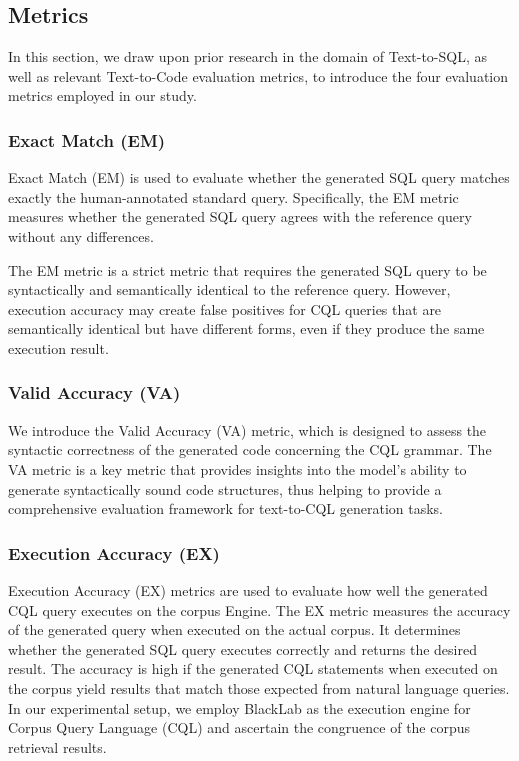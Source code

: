 \documentclass[11pt]{article}
\begin{document}
\begin{CJK*}{UTF8}{gbsn}
\subsection{Metrics}

In this section, we draw upon prior research in the domain of Text-to-SQL, as well as relevant Text-to-Code evaluation metrics, to introduce the four evaluation metrics employed in our study.

\subsubsection{Exact Match (EM)}

Exact Match (EM) is used to evaluate whether the generated SQL query matches exactly the human-annotated standard query. Specifically, the EM metric measures whether the generated SQL query agrees with the reference query without any differences. 

The EM metric is a strict metric that requires the generated SQL query to be syntactically and semantically identical to the reference query. However, execution accuracy may create false positives for CQL queries that are semantically identical but have different forms, even if they produce the same execution result\citep{yu2018spider, deng-etal-2022-recent}.  

\subsubsection{Valid Accuracy (VA)}

We introduce the Valid Accuracy (VA) metric, which is designed to assess the syntactic correctness of the generated code concerning the CQL grammar. The VA metric is a key metric that provides insights into the model's ability to generate syntactically sound code structures, thus helping to provide a comprehensive evaluation framework for text-to-CQL generation tasks.

\subsubsection{Execution Accuracy (EX)}
Execution Accuracy (EX) metrics are used to evaluate how well the generated CQL query executes on the corpus Engine. The EX metric measures the accuracy of the generated query when executed on the actual corpus. It determines whether the generated SQL query executes correctly and returns the desired result. The accuracy is high if the generated CQL statements when executed on the corpus yield results that match those expected from natural language queries. In our experimental setup, we employ BlackLab as the execution engine for Corpus Query Language (CQL) and ascertain the congruence of the corpus retrieval results.


\end{CJK*}
\end{document}
